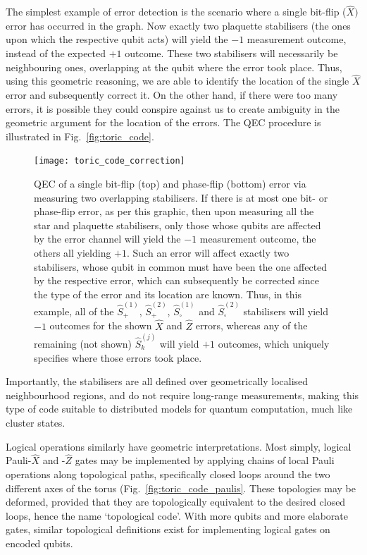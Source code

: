 The simplest example of error detection is the scenario where a single bit-flip ($\hat{X})$ error has occurred in the graph. Now exactly two plaquette stabilisers (the ones upon which the respective qubit acts) will yield the $-1$ measurement outcome, instead of the expected $+1$ outcome. These two stabilisers will necessarily be neighbouring ones, overlapping at the qubit where the error took place. Thus, using this geometric reasoning, we are able to identify the location of the single $\hat{X}$ error and subsequently correct it. On the other hand, if there were too many errors, it is possible they could conspire against us to create ambiguity in the geometric argument for the location of the errors. The QEC procedure is illustrated in Fig.~\ref{fig:toric_code}.

\begin{figure}[!htb]
	\texttt{[image: toric\_code\_correction]}
	\caption{QEC of a single bit-flip (top) and phase-flip (bottom) error via measuring two overlapping stabilisers. If there is at most one bit- or phase-flip error, as per this graphic, then upon measuring all the star and plaquette stabilisers, only those whose qubits are affected by the error channel will yield the $-1$ measurement outcome, the others all yielding $+1$. Such an error will affect exactly two stabilisers, whose qubit in common must have been the one affected by the respective error, which can subsequently be corrected since the type of the error and its location are known. Thus, in this example, all of the $\hat{S}_+^{(1)}$, $\hat{S}_+^{(2)}$, $\hat{S}_\square^{(1)}$ and $\hat{S}_\square^{(2)}$ stabilisers will yield $-1$ outcomes for the shown $\hat{X}$ and $\hat{Z}$ errors, whereas any of the remaining (not shown) $\hat{S}_k^{(j)}$ will yield $+1$ outcomes, which uniquely specifies where those errors took place.}\label{fig:toric_corr}	
\end{figure}

Importantly, the stabilisers are all defined over geometrically localised neighbourhood regions, and do not require long-range measurements, making this type of code suitable to distributed models for quantum computation, much like cluster states.

Logical operations similarly have geometric interpretations. Most simply, logical Pauli-$\hat{X}$ and -$\hat{Z}$ gates may be implemented by applying chains of local Pauli operations along topological paths, specifically closed loops around the two different axes of the torus (Fig.~\ref{fig:toric_code_paulis}. These topologies may be deformed, provided that they are topologically equivalent to the desired closed loops, hence the name `topological code'. With more qubits and more elaborate gates, similar topological definitions exist for implementing logical gates on encoded qubits.

